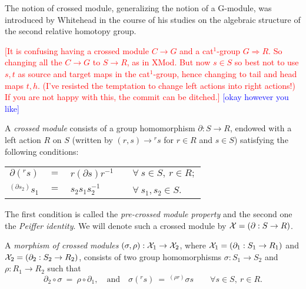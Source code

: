 \documentclass[a4paper,11pt]{article}
\theoremstyle{plain}
\theoremstyle{definition}
\begin{document}
The notion of crossed module, generalizing the notion of a G-module, 
was introduced by Whitehead \cite{whitehead-II} in the course of his studies 
on the algebraic structure of the second relative homotopy group.

\vspace*{4mm}
\textcolor{red}
{[It is confusing having a crossed module $C \to G$ 
and a cat$^1$-group $G \Rightarrow R$. 
So changing all the $C \to G$ to $S \to R$, as in XMod. 
But now $s \in S$ so best not to use $s,t$ as source and target maps 
in the cat$^1$-group, hence changing to tail and head maps $t,h$. 
(I've resisted the temptation to change left actions into right actions!) 
If you are not happy with this, the commit can be ditched.]
} 
\textcolor{blue}
{[okay however you like]} 
\vspace*{4mm}

A \emph{crossed module} consists of a group homomorphism 
$\partial : S \rightarrow R$, endowed with a left action $R$ on $S$ 
(written by $(r,s) \rightarrow {}^{r}s$ for $r \in R$ and $s \in S$) 
satisfying the following conditions:

\begin{center}
	\begin{tabular}{rclll}
	$\partial (^{r}s)$ 
		& $=$ 
			& $r(\partial s)r^{-1}$ 
				&   & $\forall~ s \in S,~ r \in R; $ \\
	$^{(\partial s_{2})}s_{1}$ 
		& $=$ 
			& $s_{2}s_{1}s_{2}^{-1}$ 
				&   & $\forall~ s_{1},s_{2} \in S$. 
	\end{tabular}
\end{center}

The first condition is called the \emph{pre-crossed module property} 
and the second one the \emph{Peiffer identity}. 
We will denote such a crossed module by $\mathcal{X} = (\partial : S \rightarrow R)$.

A \emph{morphism of crossed modules} 
$(\sigma ,\rho ) : \mathcal{X}_{1} \rightarrow \mathcal{X}_{2}$, 
where $\mathcal{X}_{1} = (\partial_{1} : S_{1} \rightarrow R_{1})$ 
and   $\mathcal{X}_{2} = (\partial_{2} : S_{2} \rightarrow R_{2})$, 
consists of two group homomorphisms $\sigma : S_{1} \rightarrow S_{2}$
and $\rho : R_{1} \rightarrow R_{2}$ such that 
\[ 
\partial_{2}\circ\sigma ~=~ \rho\circ\partial_{1}, 
\quad \mbox{and} \quad 
\sigma(^{r}s) ~=~ ^{(\rho r)}\sigma s 
\qquad
\forall s \in S,~ r \in R.
\] 
\end{document}
